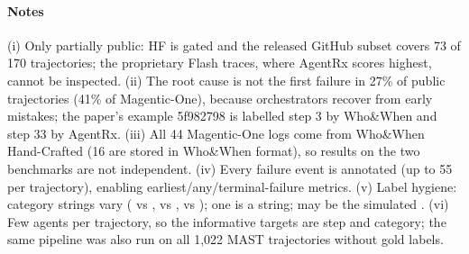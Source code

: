 \paragraph{Notes} (i) Only partially public: HF is gated and the released GitHub subset covers 73 of 170 trajectories; the proprietary Flash traces, where AgentRx scores highest, cannot be inspected. (ii) The root cause is not the first failure in 27\% of public trajectories (41\% of Magentic-One), because orchestrators recover from early mistakes; the paper's example 5f982798 is labelled step 3 by Who\&When and step 33 by AgentRx. (iii) All 44 Magentic-One logs come from Who\&When Hand-Crafted (16 are stored in Who\&When format), so results on the two benchmarks are not independent. (iv) Every failure event is annotated (up to 55 per trajectory), enabling earliest/any/terminal-failure metrics. (v) Label hygiene: category strings vary ( vs ,  vs ,  vs ); one  is a string;  may be the simulated . (vi) Few agents per trajectory, so the informative targets are step and category; the same pipeline was also run on all 1,022 MAST trajectories without gold labels.
